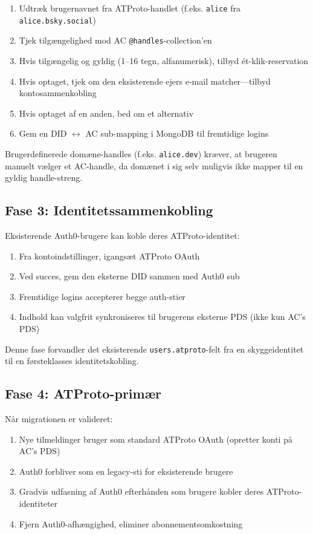 \documentclass[10pt,letterpaper,twocolumn]{article}
\begin{document}
\begin{enumerate}
  \item Udtræk brugernavnet fra ATProto-handlet (f.eks. \texttt{alice} fra \texttt{alice.bsky.social})
  \item Tjek tilgængelighed mod AC \texttt{@handles}-collection'en
  \item Hvis tilgængelig og gyldig (1--16 tegn, alfanumerisk), tilbyd ét-klik-reservation
  \item Hvis optaget, tjek om den eksisterende ejers e-mail matcher---tilbyd kontosammenkobling
  \item Hvis optaget af en anden, bed om et alternativ
  \item Gem en DID $\leftrightarrow$ AC sub-mapping i MongoDB til fremtidige logins
\end{enumerate}

Brugerdefinerede domæne-handles (f.eks. \texttt{alice.dev}) kræver, at brugeren manuelt vælger et AC-handle, da domænet i sig selv muligvis ikke mapper til en gyldig handle-streng.

\subsection{Fase 3: Identitetssammenkobling}

Eksisterende Auth0-brugere kan koble deres ATProto-identitet:

\begin{enumerate}
  \item Fra kontoindstillinger, igangsæt ATProto OAuth
  \item Ved succes, gem den eksterne DID sammen med Auth0 sub
  \item Fremtidige logins accepterer begge auth-stier
  \item Indhold kan valgfrit synkroniseres til brugerens eksterne PDS (ikke kun AC's PDS)
\end{enumerate}

Denne fase forvandler det eksisterende \texttt{users.atproto}-felt fra en skyggeidentitet til en førsteklasses identitetskobling.

\subsection{Fase 4: ATProto-primær}

Når migrationen er valideret:

\begin{enumerate}
  \item Nye tilmeldinger bruger som standard ATProto OAuth (opretter konti på AC's PDS)
  \item Auth0 forbliver som en legacy-sti for eksisterende brugere
  \item Gradvis udfasning af Auth0 efterhånden som brugere kobler deres ATProto-identiteter
  \item Fjern Auth0-afhængighed, eliminer abonnementsomkostning
\end{enumerate}
\end{document}
